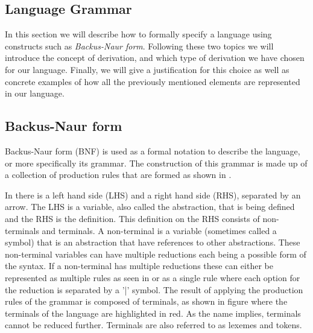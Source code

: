 \subsection{Language Grammar} \label{langGram}

In this section we will describe how to formally specify a language using constructs such as \textit{Backus-Naur form}.
Following these two topics we will introduce the concept of derivation, and which type of derivation we have chosen for our language.
Finally, we will give a justification for this choice as well as concrete examples of how all the previously mentioned elements are represented in our language.

\subsection{Backus-Naur form}

Backus-Naur form (BNF) is used as a formal notation to describe the language, or more specifically its grammar.
The construction of this grammar is made up of a collection of production rules that are formed as shown in .


In  there is a left hand side (LHS) and a right hand side (RHS), separated by an arrow. The LHS is a variable, also called the abstraction, that is being defined and the RHS is the definition.
This definition on the RHS consists of non-terminals and terminals. A non-terminal is a variable (sometimes called a symbol) that is an abstraction that have references to other abstractions.
These non-terminal variables can have multiple reductions each being a possible form of the syntax.
If a non-terminal has multiple reductions these can either be represented as multiple rules as seen in  or as a single rule where each option for the reduction is separated by a '|' symbol.
The result of applying the production rules of the grammar is composed of terminals, as shown in figure  where the terminals of the language are highlighted in red.
As the name implies, terminals cannot be reduced further. Terminals are also referred to as lexemes and tokens\cite{sebesta_concepts_2016}.


